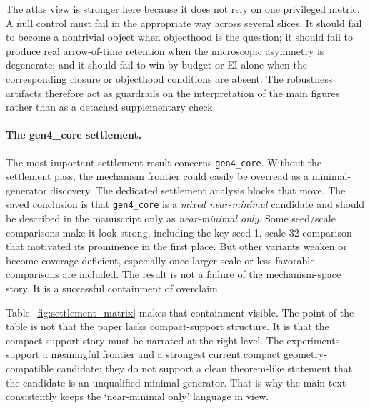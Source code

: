 \documentclass[11pt]{article}
\theoremstyle{definition}
\begin{document}
The atlas view is stronger here because it does not rely on one privileged metric. A null control must fail in the appropriate way across several slices. It should fail to become a nontrivial object when objecthood is the question; it should fail to produce real arrow-of-time retention when the microscopic asymmetry is degenerate; and it should fail to win by budget or EI alone when the corresponding closure or objecthood conditions are absent. The robustness artifacts therefore act as guardrails on the interpretation of the main figures rather than as a detached supplementary check.

\paragraph{The gen4\_core settlement.}
The most important settlement result concerns \texttt{gen4\_core}. Without the settlement pass, the mechanism frontier could easily be overread as a minimal-generator discovery. The dedicated settlement analysis blocks that move. The saved conclusion is that \texttt{gen4\_core} is a \emph{mixed near-minimal} candidate and should be described in the manuscript only as \emph{near-minimal only}. Some seed/scale comparisons make it look strong, including the key seed-1, scale-32 comparison that motivated its prominence in the first place. But other variants weaken or become coverage-deficient, especially once larger-scale or less favorable comparisons are included. The result is not a failure of the mechanism-space story. It is a successful containment of overclaim.

Table~\ref{fig:settlement_matrix} makes that containment visible. The point of the table is not that the paper lacks compact-support structure. It is that the compact-support story must be narrated at the right level. The experiments support a meaningful frontier and a strongest current compact geometry-compatible candidate; they do not support a clean theorem-like statement that the candidate is an unqualified minimal generator. That is why the main text consistently keeps the `near-minimal only' language in view.
\end{document}
